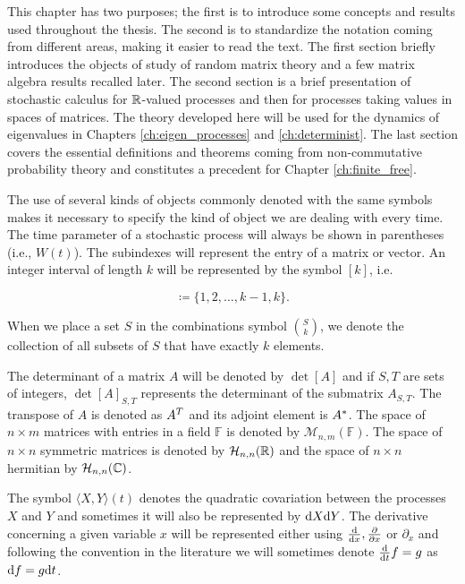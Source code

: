 This chapter has two purposes; the first is to introduce some concepts and results used throughout the thesis. The second is to standardize the notation coming from different areas, making it easier to read the text. The first section briefly introduces the objects of study of random matrix theory and a few matrix algebra results recalled later. The second section is a brief presentation of stochastic calculus for $\mathbb R$-valued processes and then for processes taking values in spaces of matrices. The theory developed here will be used for the dynamics of eigenvalues in Chapters \ref{ch:eigen_processes} and \ref{ch:determinist}. The last section covers the essential definitions and theorems coming from non-commutative probability theory and constitutes a precedent for Chapter \ref{ch:finite_free}.

The use of several kinds of objects commonly denoted with the same symbols makes it necessary to specify the kind of object we are dealing with every time. The time parameter of a stochastic process will always be shown in parentheses (i.e., $W(t)$). The subindexes will represent the entry of a matrix or vector. An integer interval of length $k$ will be represented by the symbol $[k]$, i.e.

\begin{equation*}
    [k] \coloneqq \{1,2,\dots, k-1, k\}.
\end{equation*}

When we place a set $S$ in the combinations symbol $\binom{S}{k}$, we denote the collection of all subsets of $S$ that have exactly $k$ elements. 

The determinant of a matrix $A$ will be denoted by $\det[A]$ and if $S,T$ are sets of integers, $\det[A]_{S,T}$ represents the determinant of the submatrix $A_{S,T}$. The transpose of $A$ is denoted as $A^T$ and its adjoint element is $A^*$. The space of $n\times m$ matrices with entries in a field $\mathbb F$ is denoted by $\mathcal M_{n,m}(\mathbb F)$. The space of $n\times n$ symmetric matrices is denoted by $\mathcal H_{n,n}(\mathbb R)$ and the space of $n\times n$ hermitian by $\mathcal H_{n,n}(\mathbb C)$.

The symbol $\langle X,Y \rangle(t)$ denotes the quadratic covariation between the processes $X$ and $Y$ and sometimes it will also be represented by $\mathrm d X\mathrm d Y$. The derivative concerning a given variable $x$ will be represented either using $\frac{\mathrm d}{\mathrm d x}, \frac{\partial}{\partial x}$ or $\partial_x$ and following the convention in the literature we will sometimes denote $\frac{\mathrm d}{\mathrm d t} f = g$ as $\mathrm d f = g\mathrm d t$.

